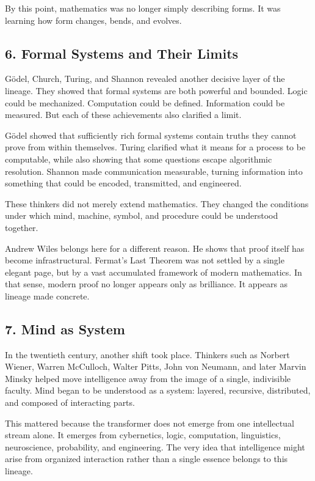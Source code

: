 By this point, mathematics was no longer simply describing forms. It was
learning how form changes, bends, and evolves.

\hypertarget{formal-systems-and-their-limits}{%
\subsection{6. Formal Systems and Their
Limits}\label{formal-systems-and-their-limits}}

Gödel, Church, Turing, and Shannon revealed another decisive layer of
the lineage. They showed that formal systems are both powerful and
bounded. Logic could be mechanized. Computation could be defined.
Information could be measured. But each of these achievements also
clarified a limit.

Gödel showed that sufficiently rich formal systems contain truths they
cannot prove from within themselves. Turing clarified what it means for
a process to be computable, while also showing that some questions
escape algorithmic resolution. Shannon made communication measurable,
turning information into something that could be encoded, transmitted,
and engineered.

These thinkers did not merely extend mathematics. They changed the
conditions under which mind, machine, symbol, and procedure could be
understood together.

Andrew Wiles belongs here for a different reason. He shows that proof
itself has become infrastructural. Fermat's Last Theorem was not settled
by a single elegant page, but by a vast accumulated framework of modern
mathematics. In that sense, modern proof no longer appears only as
brilliance. It appears as lineage made concrete.

\hypertarget{mind-as-system}{%
\subsection{7. Mind as System}\label{mind-as-system}}

In the twentieth century, another shift took place. Thinkers such as
Norbert Wiener, Warren McCulloch, Walter Pitts, John von Neumann, and
later Marvin Minsky helped move intelligence away from the image of a
single, indivisible faculty. Mind began to be understood as a system:
layered, recursive, distributed, and composed of interacting parts.

This mattered because the transformer does not emerge from one
intellectual stream alone. It emerges from cybernetics, logic,
computation, linguistics, neuroscience, probability, and engineering.
The very idea that intelligence might arise from organized interaction
rather than a single essence belongs to this lineage.

